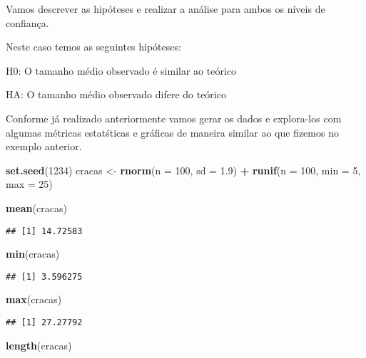 \documentclass[titlepage, oneside, openany, a4paper]{book}
\newenvironment{Shaded}{\begin{snugshade}}{\end{snugshade}}
\newcommand{\DataTypeTok}[1]{\textcolor[rgb]{0.13,0.29,0.53}{#1}}
\newcommand{\DecValTok}[1]{\textcolor[rgb]{0.00,0.00,0.81}{#1}}
\newcommand{\FloatTok}[1]{\textcolor[rgb]{0.00,0.00,0.81}{#1}}
\newcommand{\KeywordTok}[1]{\textcolor[rgb]{0.13,0.29,0.53}{\textbf{#1}}}
\newcommand{\NormalTok}[1]{#1}
\newcommand{\OperatorTok}[1]{\textcolor[rgb]{0.81,0.36,0.00}{\textbf{#1}}}
\newcommand{\StringTok}[1]{\textcolor[rgb]{0.31,0.60,0.02}{#1}}
\begin{document}
Vamos descrever as hipóteses e realizar a análise para ambos os níveis de confiança.

Neste caso temos as seguintes hipóteses:

H0: O tamanho médio observado é similar ao teórico

HA: O tamanho médio observado difere do teórico

Conforme já realizado anteriormente vamos gerar os dados e explora-los com algumas métricas estatśticas e gráficas de maneira similar ao que fizemos no exemplo anterior.

\begin{Shaded}
\begin{Highlighting}[]
\KeywordTok{set.seed}\NormalTok{(}\DecValTok{1234}\NormalTok{)}
\NormalTok{cracas <-}\StringTok{ }\KeywordTok{rnorm}\NormalTok{(}\DataTypeTok{n =} \DecValTok{100}\NormalTok{, }\DataTypeTok{sd =} \FloatTok{1.9}\NormalTok{) }\OperatorTok{+}\StringTok{ }\KeywordTok{runif}\NormalTok{(}\DataTypeTok{n =} \DecValTok{100}\NormalTok{, }\DataTypeTok{min =} \DecValTok{5}\NormalTok{, }\DataTypeTok{max =} \DecValTok{25}\NormalTok{)}

\KeywordTok{mean}\NormalTok{(cracas)}
\end{Highlighting}
\end{Shaded}

\begin{verbatim}
## [1] 14.72583
\end{verbatim}

\begin{Shaded}
\begin{Highlighting}[]
\KeywordTok{min}\NormalTok{(cracas)}
\end{Highlighting}
\end{Shaded}

\begin{verbatim}
## [1] 3.596275
\end{verbatim}

\begin{Shaded}
\begin{Highlighting}[]
\KeywordTok{max}\NormalTok{(cracas)}
\end{Highlighting}
\end{Shaded}

\begin{verbatim}
## [1] 27.27792
\end{verbatim}

\begin{Shaded}
\begin{Highlighting}[]
\KeywordTok{length}\NormalTok{(cracas)}
\end{Highlighting}
\end{Shaded}
\end{document}

